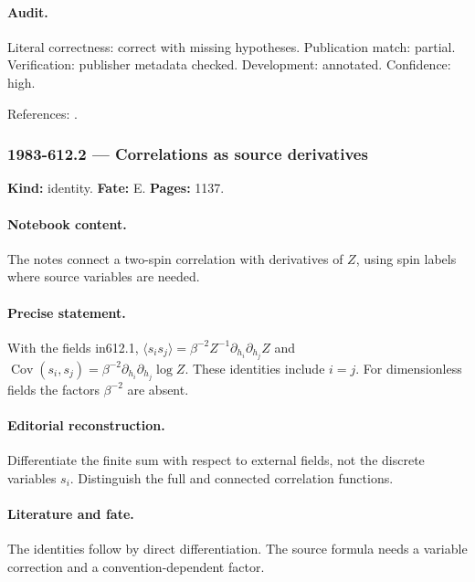 \paragraph{Audit.} Literal correctness: correct with missing hypotheses. Publication match: partial. Verification: publisher metadata checked. Development: annotated. Confidence: high.

\noindent References: \citep{ising1925ferromagnetismus}.\par

\subsubsection{1983-612.2 --- Correlations as source derivatives}

\label{item:1983-612.2}

\noindent\textbf{Kind:} identity. \textbf{Fate:} E. \textbf{Pages:} 1137.\par

\paragraph{Notebook content.} The notes connect a two-spin correlation with derivatives of $Z$, using spin labels where source variables are needed.

\paragraph{Precise statement.} With the fields in612.1, $\langle s_i s_j\rangle=\beta^{-2}Z^{-1}\partial_{h_i}\partial_{h_j}Z$ and $\operatorname{Cov}(s_i,s_j)=\beta^{-2}\partial_{h_i}\partial_{h_j}\log Z$. These identities include $i=j$. For dimensionless fields the factors $\beta^{-2}$ are absent.

\paragraph{Editorial reconstruction.} Differentiate the finite sum with respect to external fields, not the discrete variables $s_i$. Distinguish the full and connected correlation functions.

\paragraph{Literature and fate.} The identities follow by direct differentiation. The source formula needs a variable correction and a convention-dependent factor.

